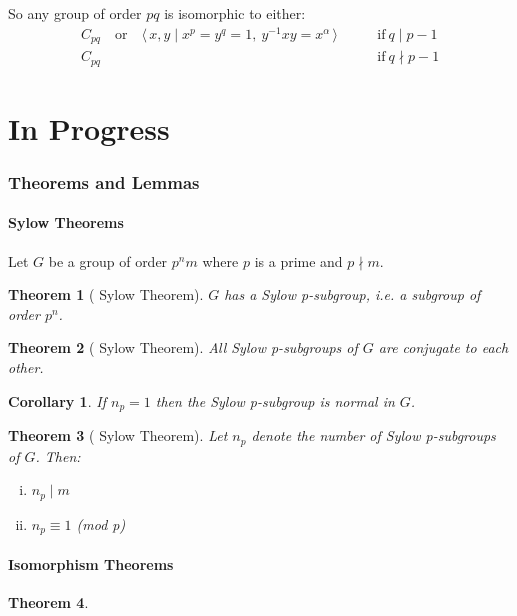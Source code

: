 \documentclass[a4paper, oneside, 12pt, final]{article}
\newtheorem{theorem}{Theorem}[section]
\newtheorem{corollary}{Corollary}[theorem]
\theoremstyle{definition}
\begin{document}
So any group of order \(pq\) is isomorphic to either:
\begin{equation*}
\begin{aligned}
    C_{pq} \quad \text{or} \quad \langle \, x, y \mid x^p = y^q = 1,\ y^{-1}xy
    = x^\alpha \, \rangle \qquad &\text{if} \ q \mid p-1 \\
    C_{pq} \qquad &\text{if} \ q \nmid p-1
\end{aligned}
\end{equation*}



\part{In Progress}

\section{Theorems and Lemmas}
\subsection{Sylow Theorems}
Let \(G\) be a group of order \(p^nm\) where \(p\) is a prime and \(p\nmid m\).
\begin{theorem}[ Sylow Theorem]
\label{thm:sylow1}
    \(G\) has a Sylow p-subgroup, i.e. a subgroup of order \(p^n\).
\end{theorem}
\begin{theorem}[ Sylow Theorem]
\label{thm:sylow2}
    All Sylow p-subgroups of \(G\) are conjugate to each other.
\end{theorem}
\begin{corollary}
    If \(n_p = 1\) then the Sylow p-subgroup is normal in \(G\).
\end{corollary}
\begin{theorem}[ Sylow Theorem]
\label{thm:sylow3}
    Let \(n_p\) denote the number of Sylow p-subgroups of \(G\).
    Then:
    \begin{enumerate}[i)]
        \item \(n_p \mid m\)
        \item \(n_p\equiv 1\) (mod p)
    \end{enumerate}
\end{theorem}

\subsection{Isomorphism Theorems}
\begin{theorem}
\label{thm:iso1}
\end{theorem}
\end{document}
